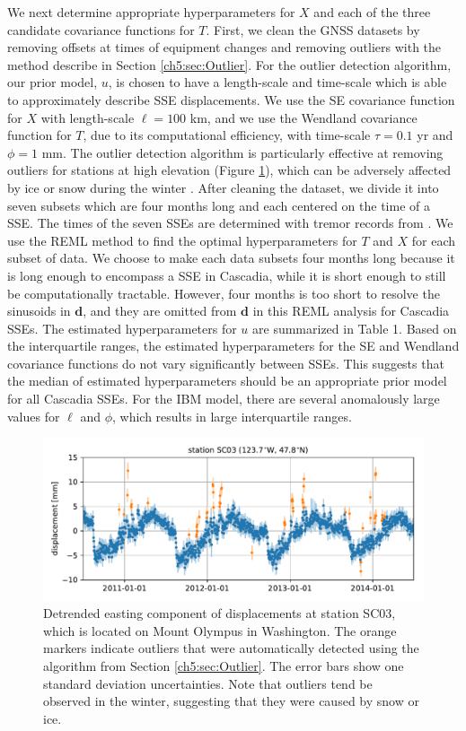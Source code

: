 We next determine appropriate hyperparameters for $X$ and each of the
three candidate covariance functions for $T$. First, we clean the GNSS
datasets by removing offsets at times of equipment changes and
removing outliers with the method describe in Section
\ref{ch5:sec:Outlier}. For the outlier detection algorithm, our prior
model, $u$, is chosen to have a length-scale and time-scale which is
able to approximately describe SSE displacements. We use the SE
covariance function for $X$ with length-scale $\ell = 100$ km, and we
use the Wendland covariance function for $T$, due to its computational
efficiency, with time-scale $\tau = 0.1$ yr and $\phi = 1$ mm.  The
outlier detection algorithm is particularly effective at removing
outliers for stations at high elevation (Figure
\ref{ch5:fig:Outliers}), which can be adversely affected by ice or
snow during the winter \citep{Lisowski2008}. After cleaning the
dataset, we divide it into seven subsets which are four months long
and each centered on the time of a SSE. The times of the seven SSEs
are determined with tremor records from \cite{Wech2010}. We use the
REML method to find the optimal hyperparameters for $T$ and $X$ for
each subset of data. We choose to make each data subsets four months
long because it is long enough to encompass a SSE in Cascadia, while
it is short enough to still be computationally tractable. However,
four months is too short to resolve the sinusoids in $\mathbf{d}$, and
they are omitted from $\mathbf{d}$ in this REML analysis for Cascadia
SSEs. The estimated hyperparameters for $u$ are summarized in Table 1.
Based on the interquartile ranges, the estimated hyperparameters for
the SE and Wendland covariance functions do not vary significantly
between SSEs. This suggests that the median of estimated
hyperparameters should be an appropriate prior model for all Cascadia
SSEs. For the IBM model, there are several anomalously large values
for $\ell$ and $\phi$, which results in large interquartile ranges.

\begin{figure}
\includegraphics{ch5/figures/outliers/outliers.pdf}
\caption{Detrended easting component of displacements at station SC03,
which is located on Mount Olympus in Washington. The orange markers
indicate outliers that were automatically detected using the algorithm
from Section \ref{ch5:sec:Outlier}. The error bars show one standard
deviation uncertainties. Note that outliers tend be observed in the
winter, suggesting that they were caused by snow or ice.}
\label{ch5:fig:Outliers}
\end{figure}

